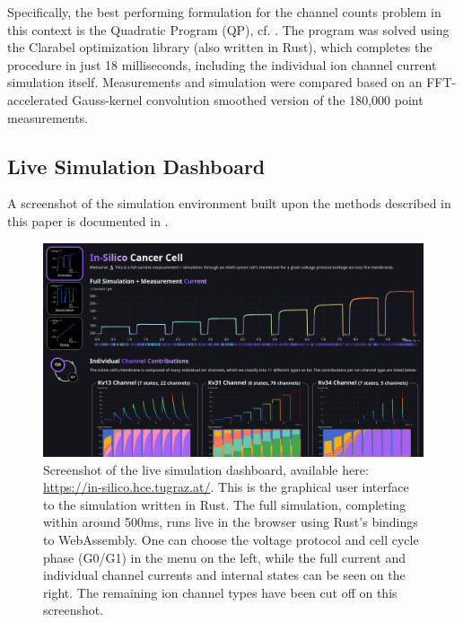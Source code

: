 Specifically, the best performing formulation for the channel counts problem in this context is the Quadratic Program (QP), cf. .
The program was solved using the Clarabel \parencite{2024-clarabel} optimization library (also written in Rust), which completes the procedure in just 18 milliseconds, including the individual ion channel current simulation itself.
Measurements and simulation were compared based on an FFT-accelerated Gauss-kernel convolution smoothed version of the 180,000 point measurements.

\subsection{Live Simulation Dashboard}
A screenshot of the simulation environment built upon the methods described in this paper is documented in .

\begin{figure}[ht]
  \includegraphics[width=\textwidth]{../figures/above-the-fold-screenshot.png}
  \caption{Screenshot of the live simulation dashboard, available here: \url{https://in-silico.hce.tugraz.at/}. This is the graphical user interface to the simulation written in Rust. The full simulation, completing within around 500ms, runs live in the browser using Rust's bindings to WebAssembly. One can choose the voltage protocol and cell cycle phase (G0/G1) in the menu on the left, while the full current and individual channel currents and internal states can be seen on the right. The remaining ion channel types have been cut off on this screenshot.}
  \label{figure:screenshot}
\end{figure}
